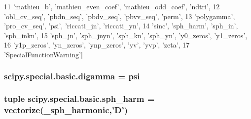 \begin{DoxyCode}
11            \textcolor{stringliteral}{'mathieu\_b'}, \textcolor{stringliteral}{'mathieu\_even\_coef'}, \textcolor{stringliteral}{'mathieu\_odd\_coef'}, \textcolor{stringliteral}{'ndtri'},
12            \textcolor{stringliteral}{'obl\_cv\_seq'}, \textcolor{stringliteral}{'pbdn\_seq'}, \textcolor{stringliteral}{'pbdv\_seq'}, \textcolor{stringliteral}{'pbvv\_seq'}, \textcolor{stringliteral}{'perm'},
13            \textcolor{stringliteral}{'polygamma'}, \textcolor{stringliteral}{'pro\_cv\_seq'}, \textcolor{stringliteral}{'psi'}, \textcolor{stringliteral}{'riccati\_jn'}, \textcolor{stringliteral}{'riccati\_yn'},
14            \textcolor{stringliteral}{'sinc'}, \textcolor{stringliteral}{'sph\_harm'}, \textcolor{stringliteral}{'sph\_in'}, \textcolor{stringliteral}{'sph\_inkn'},
15            \textcolor{stringliteral}{'sph\_jn'}, \textcolor{stringliteral}{'sph\_jnyn'}, \textcolor{stringliteral}{'sph\_kn'}, \textcolor{stringliteral}{'sph\_yn'}, \textcolor{stringliteral}{'y0\_zeros'}, \textcolor{stringliteral}{'y1\_zeros'},
16            \textcolor{stringliteral}{'y1p\_zeros'}, \textcolor{stringliteral}{'yn\_zeros'}, \textcolor{stringliteral}{'ynp\_zeros'}, \textcolor{stringliteral}{'yv'}, \textcolor{stringliteral}{'yvp'}, \textcolor{stringliteral}{'zeta'},
17            \textcolor{stringliteral}{'SpecialFunctionWarning'}]
\end{DoxyCode}
\hypertarget{namespacescipy_1_1special_1_1basic_ab4529d1e1d519275dda5023781fb58d8}{}
\subsubsection[{digamma}]{\setlength{\rightskip}{0pt plus 5cm}scipy.\+special.\+basic.\+digamma = {\bf psi}}\label{namespacescipy_1_1special_1_1basic_ab4529d1e1d519275dda5023781fb58d8}
\hypertarget{namespacescipy_1_1special_1_1basic_a0d632757ff151223a8f17c95085b1b6c}{}
\subsubsection[{sph\+\_\+harm}]{\setlength{\rightskip}{0pt plus 5cm}tuple scipy.\+special.\+basic.\+sph\+\_\+harm = vectorize(\+\_\+sph\+\_\+harmonic,'{\bf D}')}\label{namespacescipy_1_1special_1_1basic_a0d632757ff151223a8f17c95085b1b6c}
